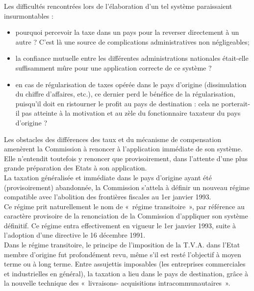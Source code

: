 \documentclass{book}
\begin{document}
Les difficultés rencontrées lors de l'élaboration d'un tel système paraissaient insurmontables :\\

\begin{itemize}
\item pourquoi percevoir la taxe dans un pays pour la reverser directement à un autre ?
C'est là une source de complications administratives non négligeables;
\item la confiance mutuelle entre les différentes administrations nationales était-elle
suffisamment mûre pour une application correcte de ce système ?
\item en cas de régularisation de taxes opérée dans le pays d'origine (dissimulation du
chiffre d'affaires, etc.), ce dernier perd le bénéfice de la régularisation, puisqu'il
doit en ristourner le profit au pays de destination : cela ne porterait-il pas atteinte à
la motivation et au zèle du fonctionnaire taxateur du pays d'origine ?

\end{itemize}

\null 

Les obstacles des différences des taux et du mécanisme de compensation amenèrent la
Commission à renoncer à l'application immédiate de son système. Elle n'entendit toutefois y
renoncer que provisoirement, dans l'attente d'une plus grande préparation des Etats à son
application.\\

La taxation généralisée et immédiate dans le pays d'origine ayant été (provisoirement)
abandonnée, la Commission s'attela à définir un nouveau régime compatible avec l'abolition
des frontières fiscales au 1er janvier 1993.\\

Ce régime prit naturellement le nom de «~régime transitoire~», par référence au caractère
provisoire de la renonciation de la Commission d'appliquer son système définitif. Ce régime
entra effectivement en vigueur le 1er janvier 1993, suite à l'adoption d'une directive le 16
décembre 1991.\\

Dans le régime transitoire, le principe de l'imposition de la T.V.A. dans l'Etat membre
d'origine fut profondément revu, même s’il est resté l’objectif à moyen terme ou à long terme.
Entre assujettis imposables (les entreprises commerciales et industrielles en général), la
taxation a lieu dans le pays de destination, grâce à la nouvelle technique des «~livraisons-
acquisitions intracommunautaires~».\\
\end{document}
